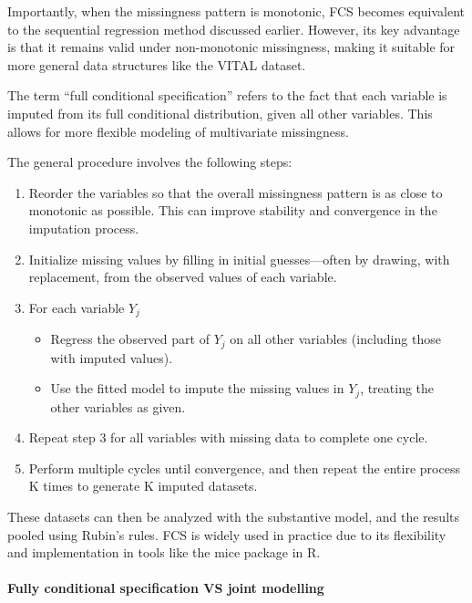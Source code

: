 \documentclass{article}
\providecommand{\tightlist}{%
  \setlength{\itemsep}{0pt}\setlength{\parskip}{0pt}}
\begin{document}
Importantly, when the missingness pattern is monotonic, FCS becomes
equivalent to the sequential regression method discussed earlier.
However, its key advantage is that it remains valid under non-monotonic
missingness, making it suitable for more general data structures like
the VITAL dataset.

The term ``full conditional specification'' refers to the fact that each
variable is imputed from its full conditional distribution, given all
other variables. This allows for more flexible modeling of multivariate
missingness.

The general procedure involves the following steps:

\begin{enumerate}
\def\labelenumi{\arabic{enumi}.}
\item
  Reorder the variables so that the overall missingness pattern is as
  close to monotonic as possible. This can improve stability and
  convergence in the imputation process.
\item
  Initialize missing values by filling in initial guesses---often by
  drawing, with replacement, from the observed values of each variable.
\item
  For each variable \(Y_{j}\)

  \begin{itemize}
  \tightlist
  \item
    Regress the observed part of \(Y_{j}\) on all other variables
    (including those with imputed values).
  \item
    Use the fitted model to impute the missing values in \(Y_{j}\),
    treating the other variables as given.
  \end{itemize}
\item
  Repeat step 3 for all variables with missing data to complete one
  cycle.
\item
  Perform multiple cycles until convergence, and then repeat the entire
  process K times to generate K imputed datasets.
\end{enumerate}

These datasets can then be analyzed with the substantive model, and the
results pooled using Rubin's rules. FCS is widely used in practice due
to its flexibility and implementation in tools like the mice package in
R.

\paragraph{Fully conditional specification VS joint
modelling}\label{fully-conditional-specification-vs-joint-modelling}
\end{document}
